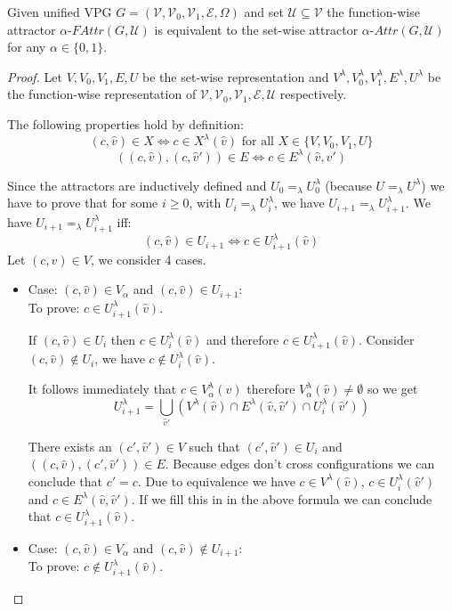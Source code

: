 \begin{lemma}
	\label{lem_attr_equal}
	Given unified VPG $G = (\mathcal{V},\mathcal{V}_0,\mathcal{V}_1, \mathcal{E}, \Omega)$ and set $\mathcal{U} \subseteq \mathcal{V}$ the function-wise attractor $\alpha\textit{-FAttr}(G,\mathcal{U})$ is equivalent to the set-wise attractor $\alpha\textit{-Attr}(G,\mathcal{U})$ for any $\alpha \in \{0,1\}$.
	\begin{proof}
		Let $V,V_0,V_1,E,U$ be the set-wise representation and $V^\lambda,V_0^\lambda,V_1^\lambda,E^\lambda,U^\lambda$ be the function-wise representation of $\mathcal{V},\mathcal{V}_0,\mathcal{V}_1,\mathcal{E},\mathcal{U}$ respectively.
		
		The following properties hold by definition:
		\[ (c,\hat{v}) \in X \iff c \in X^\lambda(\hat{v})\text{ for all } X\in \{V,V_0,V_1,U\}\]
		\[ ((c,\hat{v}),(c,\hat{v}')) \in E \iff c \in E^\lambda(\hat{v},\hat{v}') \]
		
		Since the attractors are inductively defined and $U_0 =_\lambda U^\lambda_0$ (because $U =_\lambda U^\lambda$) we have to prove that for some $i \geq 0$, with $U_i =_\lambda U^\lambda_i$,  we have $U_{i+1} =_\lambda U^\lambda_{i+1}$. We have $U_{i+1} =_\lambda U^\lambda_{i+1}$ iff:
		\[ (c,\hat{v}) \in U_{i+1} \iff c \in U^\lambda_{i+1}(\hat{v}) \]
		Let $(c,\hat{v}) \in V$, we consider 4 cases.
		\begin{itemize}
			\item Case: $(c, \hat{v}) \in V_{\alpha}$ and $(c,\hat{v}) \in U_{i+1}$:\\
			To prove: $c \in U^\lambda_{i+1}(\hat{v})$.
			
			If $(c,\hat{v}) \in U_i$ then $c \in U^\lambda_i(\hat{v})$ and therefore $c \in U^\lambda_{i+1}(\hat{v})$. Consider $(c,\hat{v}) \notin U_i$, we have $c \notin U^\lambda_i(\hat{v})$.
			
			
			It follows immediately that $c \in V^\lambda_{\alpha}(\hat{v})$ therefore $V^\lambda_{\alpha}(\hat{v}) \neq \emptyset$ so we get
			\[ U^\lambda_{i+1} =\bigcup_{\hat{v}'} (V^\lambda(\hat{v}) \cap E^\lambda(\hat{v},\hat{v}') \cap U^\lambda_i(\hat{v}')) \]
			
			There exists an $(c',\hat{v}') \in V$ such that $(c',\hat{v}') \in U_i$ and $((c,\hat{v}),(c',\hat{v}')) \in E$. Because edges don't cross configurations we can conclude that $c' = c$. Due to equivalence we have $c \in V^\lambda(\hat{v})$, $c \in U^\lambda_i(\hat{v}')$ and $c \in E^\lambda(\hat{v},\hat{v}')$. If we fill this in in the above formula we can conclude that $c \in U^\lambda_{i+1}(\hat{v})$.
			\item Case: $(c, \hat{v}) \in V_{\alpha}$ and $(c,\hat{v}) \notin U_{i+1}$:\\
			To prove: $c \notin U^\lambda_{i+1}(\hat{v})$.
			

\end{itemize}
\end{proof}
\end{lemma}
